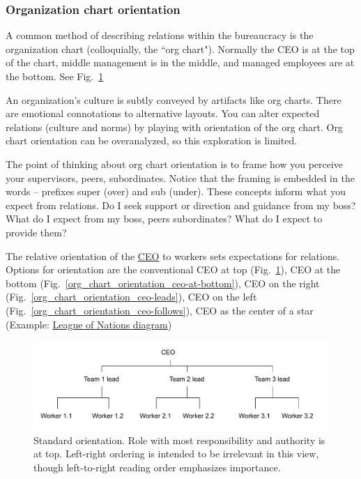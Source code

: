 \subsubsection{Organization chart orientation
\label{org-chart-orientation}}

A common method of describing relations within the bureaucracy is the organization chart (colloquially, the ``org chart"). Normally the CEO is at the top of the chart, middle management is in the middle, and managed employees are at the bottom. See Fig.~\ref{org_chart_orientation_ceo-at-top} 


An organization's culture is subtly conveyed by artifacts like org charts. 
There are emotional connotations to alternative layouts. You can alter expected relations (culture and norms) by playing with orientation of the org chart.
Org chart orientation can be overanalyzed, so this exploration is limited.

The point of thinking about org chart orientation is to frame how you perceive your supervisors, peers, subordinates. Notice that the framing is embedded in the words -- prefixes super (over) and sub (under). 
These concepts inform what you expect from relations.
Do I seek support or direction and guidance from my boss? What do I expect from my boss, peers subordinates? What do I expect to provide them?


The relative orientation of the \href{https://en.wikipedia.org/wiki/Chief_executive_officer}{CEO} to workers sets expectations for relations. 
Options for orientation are the conventional CEO at top
(Fig.~\ref{org_chart_orientation_ceo-at-top}), 
CEO at the bottom (Fig.~\ref{org_chart_orientation_ceo-at-bottom}),
CEO on the right (Fig.~\ref{org_chart_orientation_ceo-leads}),
CEO on the left (Fig.~\ref{org_chart_orientation_ceo-follows}),
CEO as the center of a star 
(Example: \href{https://en.wikipedia.org/wiki/File:League_of_Nations_Organization.png}{League of Nations diagram})

\begin{figure}
\includegraphics[width=1\textwidth]{images/org-chart-orientation-ceo-at-top.pdf}
\caption{Standard orientation. Role with most responsibility and authority is at top. Left-right ordering is intended to be irrelevant in this view, though left-to-right reading order emphasizes importance.}
\label{org_chart_orientation_ceo-at-top}
\end{figure}

